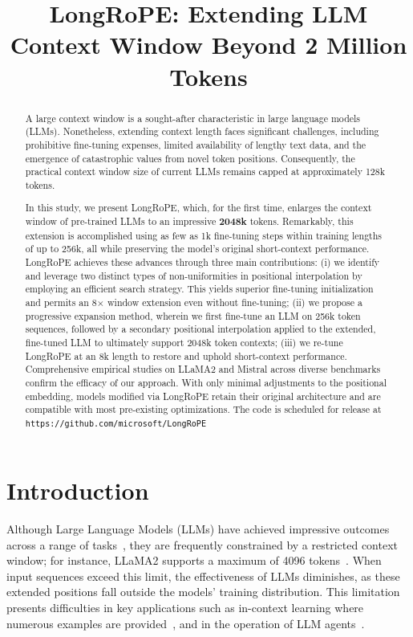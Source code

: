 \title{LongRoPE: Extending LLM Context Window Beyond 2 Million Tokens}

\begin{abstract}
A large context window is a sought-after characteristic in large language models (LLMs). Nonetheless, extending context length faces significant challenges, including prohibitive fine-tuning expenses, limited availability of lengthy text data, and the emergence of catastrophic values from novel token positions. Consequently, the practical context window size of current LLMs remains capped at approximately 128k tokens.

In this study, we present LongRoPE, which, for the first time, enlarges the context window of pre-trained LLMs to an impressive \textbf{2048k} tokens. Remarkably, this extension is accomplished using as few as 1k fine-tuning steps within training lengths of up to 256k, all while preserving the model’s original short-context performance. LongRoPE achieves these advances through three main contributions: (i) we identify and leverage two distinct types of non-uniformities in positional interpolation by employing an efficient search strategy. This yields superior fine-tuning initialization and permits an 8$\times$ window extension even without fine-tuning; (ii) we propose a progressive expansion method, wherein we first fine-tune an LLM on 256k token sequences, followed by a secondary positional interpolation applied to the extended, fine-tuned LLM to ultimately support 2048k token contexts; (iii) we re-tune LongRoPE at an 8k length to restore and uphold short-context performance. Comprehensive empirical studies on LLaMA2 and Mistral across diverse benchmarks confirm the efficacy of our approach. With only minimal adjustments to the positional embedding, models modified via LongRoPE retain their original architecture and are compatible with most pre-existing optimizations. The code is scheduled for release at \texttt{https://github.com/microsoft/LongRoPE}
\end{abstract}

\section{Introduction}

Although Large Language Models (LLMs) have achieved impressive outcomes across a range of tasks~\cite{gpt4,llama2}, they are frequently constrained by a restricted context window; for instance, LLaMA2 supports a maximum of 4096 tokens~\cite{llama2}. When input sequences exceed this limit, the effectiveness of LLMs diminishes, as these extended positions fall outside the models' training distribution. This limitation presents difficulties in key applications such as in-context learning where numerous examples are provided~\cite{Huang2023FewerIM}, and in the operation of LLM agents~\cite{park2023generative,madaan2023selfrefine}.

